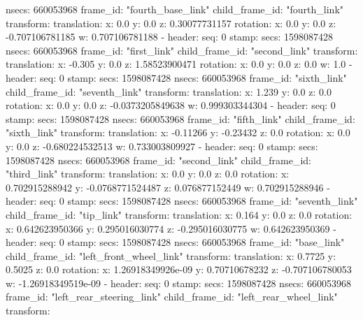         nsecs: 660053968
      frame_id: "fourth_base_link"
    child_frame_id: "fourth_link"
    transform: 
      translation: 
        x: 0.0
        y: 0.0
        z: 0.30077731157
      rotation: 
        x: 0.0
        y: 0.0
        z: -0.707106781185
        w: 0.707106781188
  - 
    header: 
      seq: 0
      stamp: 
        secs: 1598087428
        nsecs: 660053968
      frame_id: "first_link"
    child_frame_id: "second_link"
    transform: 
      translation: 
        x: -0.305
        y: 0.0
        z: 1.58523900471
      rotation: 
        x: 0.0
        y: 0.0
        z: 0.0
        w: 1.0
  - 
    header: 
      seq: 0
      stamp: 
        secs: 1598087428
        nsecs: 660053968
      frame_id: "sixth_link"
    child_frame_id: "seventh_link"
    transform: 
      translation: 
        x: 1.239
        y: 0.0
        z: 0.0
      rotation: 
        x: 0.0
        y: 0.0
        z: -0.0373205849638
        w: 0.999303344304
  - 
    header: 
      seq: 0
      stamp: 
        secs: 1598087428
        nsecs: 660053968
      frame_id: "fifth_link"
    child_frame_id: "sixth_link"
    transform: 
      translation: 
        x: -0.11266
        y: -0.23432
        z: 0.0
      rotation: 
        x: 0.0
        y: 0.0
        z: -0.680224532513
        w: 0.733003809927
  - 
    header: 
      seq: 0
      stamp: 
        secs: 1598087428
        nsecs: 660053968
      frame_id: "second_link"
    child_frame_id: "third_link"
    transform: 
      translation: 
        x: 0.0
        y: 0.0
        z: 0.0
      rotation: 
        x: 0.702915288942
        y: -0.0768771524487
        z: 0.076877152449
        w: 0.702915288946
  - 
    header: 
      seq: 0
      stamp: 
        secs: 1598087428
        nsecs: 660053968
      frame_id: "seventh_link"
    child_frame_id: "tip_link"
    transform: 
      translation: 
        x: 0.164
        y: 0.0
        z: 0.0
      rotation: 
        x: 0.642623950366
        y: 0.295016030774
        z: -0.295016030775
        w: 0.642623950369
  - 
    header: 
      seq: 0
      stamp: 
        secs: 1598087428
        nsecs: 660053968
      frame_id: "base_link"
    child_frame_id: "left_front_wheel_link"
    transform: 
      translation: 
        x: 0.7725
        y: 0.5025
        z: 0.0
      rotation: 
        x: 1.26918349926e-09
        y: 0.70710678232
        z: -0.707106780053
        w: -1.26918349519e-09
  - 
    header: 
      seq: 0
      stamp: 
        secs: 1598087428
        nsecs: 660053968
      frame_id: "left_rear_steering_link"
    child_frame_id: "left_rear_wheel_link"
    transform: 
